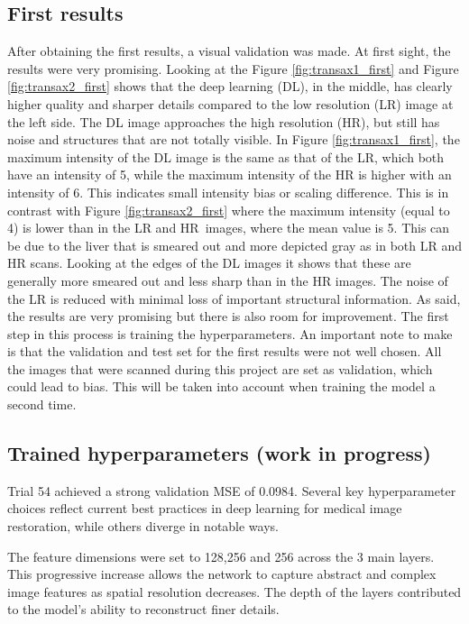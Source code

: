 \documentclass[twocolumn]{article}
\begin{document}
\subsection{First results}
After obtaining the first results, a visual validation was made. At first sight, the results were very promising. 
Looking at the Figure \ref{fig:transax1_first} and Figure \ref{fig:transax2_first} shows that the deep learning (DL), in the middle, has clearly higher quality and sharper details compared to the low resolution (LR) image at the left side. 
The DL image approaches the high resolution (HR), but still has noise and structures that are not totally visible. 
In Figure \ref{fig:transax1_first}, the maximum intensity of the DL image is the same as that of the LR, which both have an intensity of 5, while the maximum intensity of the HR is higher with an intensity of 6. 
This indicates small intensity bias or scaling difference. 
This is in contrast with Figure \ref{fig:transax2_first} where the maximum intensity (equal to 4) is lower than in the LR and HR images, where the mean value is 5. 
This can be due to the liver that is smeared out and more depicted gray as in both LR and HR scans.
Looking at the edges of the DL images it shows that these are generally more smeared out and less sharp than in the HR images. 
The noise of the LR is reduced with minimal loss of important structural information. 
As said, the results are very promising but there is also room for improvement. The first step in this process is training the hyperparameters. 
An important note to make is that the validation and test set for the first results were not well chosen. 
All the images that were scanned during this project are set as validation, which could lead to bias. 
This will be taken into account when training the model a second time.

\subsection{Trained hyperparameters (work in progress)}
Trial 54 achieved a strong validation MSE of 0.0984. 
Several key hyperparameter choices reflect current best practices in deep learning for medical image restoration, while others diverge in notable ways. 

The feature dimensions were set to 128,256 and 256 across the 3 main layers. 
This progressive increase allows the network to capture abstract and complex image features as spatial resolution decreases. 
The depth of the layers contributed to the model's ability to reconstruct finer details.
\end{document}
